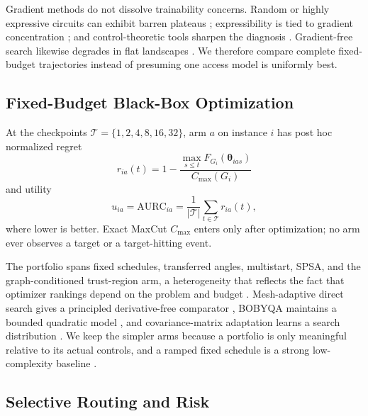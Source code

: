 \documentclass[aps,prx,reprint,superscriptaddress,floatfix]{revtex4-2}
\newcommand{\AURC}{\mathrm{AURC}}
\begin{document}
Gradient methods do not dissolve trainability concerns.  Random or highly
expressive circuits can exhibit barren plateaus \citep{mcclean2018barren};
expressibility is tied to gradient concentration \citep{holmes2022connecting};
and control-theoretic tools sharpen the diagnosis
\citep{larocca2022diagnosing}.  Gradient-free search likewise degrades in flat
landscapes \citep{arrasmith2021effect}.  We therefore compare complete
fixed-budget trajectories instead of presuming one access model is uniformly
best.

\subsection{Fixed-Budget Black-Box Optimization}

At the checkpoints $\mathcal T=\{1,2,4,8,16,32\}$, arm $a$ on instance $i$ has
post hoc normalized regret
\begin{equation}
 r_{ia}(t)=1-
 \frac{\max_{s\le t}F_{G_i}(\bm\theta_{ias})}{C_{\max}(G_i)}
 \label{eq:regret}
\end{equation}
and utility
\begin{equation}
 u_{ia}=\AURC_{ia}=
 \frac{1}{|\mathcal T|}\sum_{t\in\mathcal T}r_{ia}(t),
 \label{eq:aurc}
\end{equation}
where lower is better.  Exact MaxCut $C_{\max}$ enters only after optimization;
no arm ever observes a target or a target-hitting event.

The portfolio spans fixed schedules, transferred angles, multistart, SPSA, and
the graph-conditioned trust-region arm, a heterogeneity that reflects the fact
that optimizer rankings depend on the problem and budget
\citep{bonet2023performance}.  Mesh-adaptive direct search gives a principled
derivative-free comparator \citep{audet2006mesh}, BOBYQA maintains a bounded
quadratic model \citep{powell2009bobyqa}, and covariance-matrix adaptation learns
a search distribution \citep{hansen2001cma}.  We keep the simpler arms because a
portfolio is only meaningful relative to its actual controls, and a ramped
fixed schedule is a strong low-complexity baseline \citep{montanez2025ramp}.

\subsection{Selective Routing and Risk}
\end{document}
